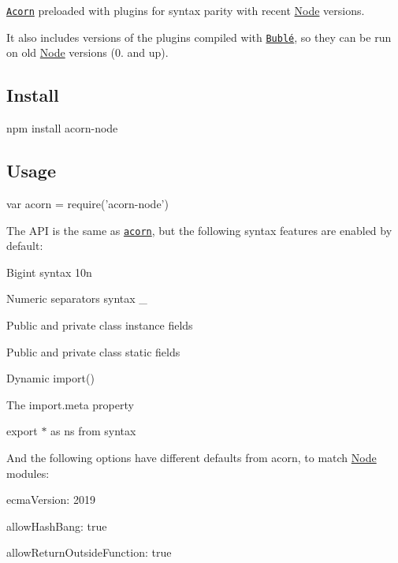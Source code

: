 \href{https://github.com/acornjs/acorn}{\tt Acorn} preloaded with plugins for syntax parity with recent \mbox{\hyperlink{classNode}{Node}} versions.

It also includes versions of the plugins compiled with \href{https://github.com/rich-harris/buble}{\tt Bublé}, so they can be run on old \mbox{\hyperlink{classNode}{Node}} versions (0. and up).

\href{https://www.npmjs.com/package/acorn-node}{\tt } \href{https://travis-ci.org/browserify/acorn-node}{\tt } \href{http://npm.im/standard}{\tt }

\subsection*{Install}


\begin{DoxyCode}
npm install acorn-node
\end{DoxyCode}


\subsection*{Usage}


\begin{DoxyCode}
var acorn = require('acorn-node')
\end{DoxyCode}


The A\+PI is the same as \href{https://github.com/acornjs/acorn}{\tt acorn}, but the following syntax features are enabled by default\+:


\begin{DoxyItemize}
\item Bigint syntax {\ttfamily 10n}
\item Numeric separators syntax {\+\_}
\item Public and private class instance fields
\item Public and private class static fields
\item Dynamic {\ttfamily import()}
\item The {\ttfamily import.\+meta} property
\item {\ttfamily export $\ast$ as ns from} syntax
\end{DoxyItemize}

And the following options have different defaults from acorn, to match \mbox{\hyperlink{classNode}{Node}} modules\+:


\begin{DoxyItemize}
\item {\ttfamily ecma\+Version\+: 2019}
\item {\ttfamily allow\+Hash\+Bang\+: true}
\item {\ttfamily allow\+Return\+Outside\+Function\+: true}
\end{DoxyItemize}


